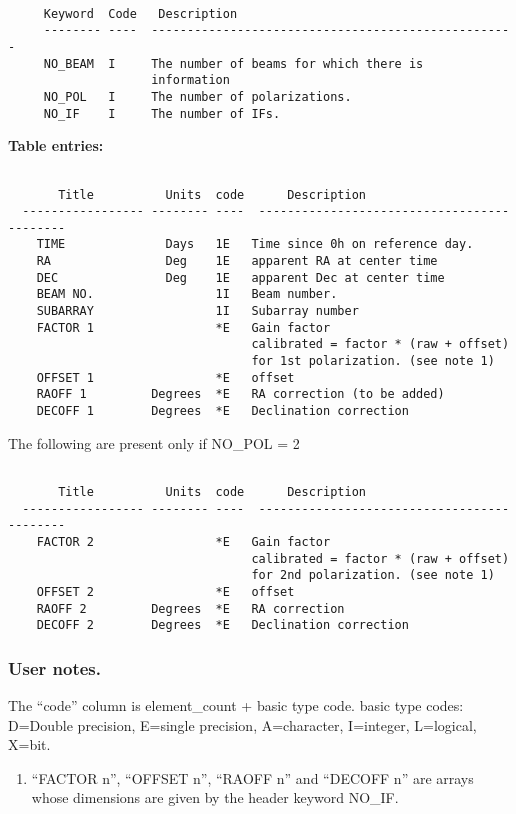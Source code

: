 \begin{verbatim}
 
     Keyword  Code   Description
     -------- ----  ---------------------------------------------------
     NO_BEAM  I     The number of beams for which there is
                    information
     NO_POL   I     The number of polarizations.
     NO_IF    I     The number of IFs.

\end{verbatim}
{\bf Table entries:}
\begin{verbatim}

       Title          Units  code      Description
  ----------------- -------- ----  -------------------------------------------
    TIME              Days   1E   Time since 0h on reference day.
    RA                Deg    1E   apparent RA at center time
    DEC               Deg    1E   apparent Dec at center time
    BEAM NO.                 1I   Beam number.
    SUBARRAY                 1I   Subarray number
    FACTOR 1                 *E   Gain factor
                                  calibrated = factor * (raw + offset)
                                  for 1st polarization. (see note 1)
    OFFSET 1                 *E   offset
    RAOFF 1         Degrees  *E   RA correction (to be added)
    DECOFF 1        Degrees  *E   Declination correction

\end{verbatim}
The following are present only if NO\_POL = 2
\begin{verbatim}

       Title          Units  code      Description
  ----------------- -------- ----  -------------------------------------------
    FACTOR 2                 *E   Gain factor
                                  calibrated = factor * (raw + offset)
                                  for 2nd polarization. (see note 1)
    OFFSET 2                 *E   offset
    RAOFF 2         Degrees  *E   RA correction
    DECOFF 2        Degrees  *E   Declination correction
\end{verbatim}

\subsubsection{User notes.}

  The ``code'' column is element\_count + basic type code.
basic type codes: D=Double precision, E=single precision, A=character,
I=integer, L=logical, X=bit.
\begin{enumerate}
\item  ``FACTOR n'', ``OFFSET n'', ``RAOFF n'' and ``DECOFF n''
are arrays whose dimensions are given by the header keyword NO\_IF.
\end{enumerate}
 
